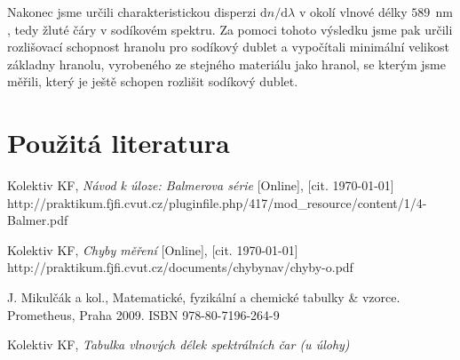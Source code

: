 \documentclass[english]{article}
\newcommand{\unit}[1]{\ \mathrm{#1}}
\newcommand{\dd}{\mathrm{d}}
\begin{document}
	Nakonec jsme určili charakteristickou disperzi $\dd n/\dd \lambda$ v okolí vlnové délky $589~\unit{nm}$, tedy žluté čáry v sodíkovém spektru. Za pomoci tohoto výsledku jsme pak určili rozlišovací schopnost hranolu pro sodíkový dublet a vypočítali minimální velikost základny hranolu, vyrobeného ze stejného materiálu jako hranol, se kterým jsme měřili, který je ještě schopen rozlišit sodíkový dublet.
	
\section {Použitá literatura}
\begingroup
\renewcommand{\section}[2]{}

\begin{thebibliography}{9}
 Kolektiv KF, \emph{Návod k úloze: Balmerova série} [Online], [cit. \today] \newline http://praktikum.fjfi.cvut.cz/pluginfile.php/417/mod\_resource/content/1/4-Balmer.pdf



 Kolektiv KF, \emph{Chyby měření} [Online], [cit. \today] \newline http://praktikum.fjfi.cvut.cz/documents/chybynav/chyby-o.pdf


 J. Mikulčák a kol., Matematické, fyzikální a chemické tabulky \& vzorce. Prometheus,
Praha 2009.\newline
ISBN 978-80-7196-264-9

 Kolektiv KF, \emph{Tabulka vlnových délek spektrálních čar (u úlohy)}



\end{thebibliography}
\endgroup
\setcounter{equation}{0}
\end{document}
